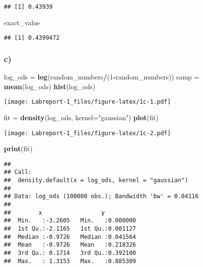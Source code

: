 \documentclass[]{article}
\newenvironment{Shaded}{\begin{snugshade}}{\end{snugshade}}
\newcommand{\DataTypeTok}[1]{\textcolor[rgb]{0.13,0.29,0.53}{#1}}
\newcommand{\DecValTok}[1]{\textcolor[rgb]{0.00,0.00,0.81}{#1}}
\newcommand{\KeywordTok}[1]{\textcolor[rgb]{0.13,0.29,0.53}{\textbf{#1}}}
\newcommand{\NormalTok}[1]{#1}
\newcommand{\OperatorTok}[1]{\textcolor[rgb]{0.81,0.36,0.00}{\textbf{#1}}}
\newcommand{\StringTok}[1]{\textcolor[rgb]{0.31,0.60,0.02}{#1}}
\begin{document}
\begin{verbatim}
## [1] 0.43939
\end{verbatim}

\begin{Shaded}
\begin{Highlighting}[]
\NormalTok{exact_value}
\end{Highlighting}
\end{Shaded}

\begin{verbatim}
## [1] 0.4399472
\end{verbatim}

\hypertarget{c}{%
\subsubsection{c)}\label{c}}

\begin{Shaded}
\begin{Highlighting}[]
\NormalTok{log_ods =}\StringTok{ }\KeywordTok{log}\NormalTok{(random_numbers}\OperatorTok{/}\NormalTok{(}\DecValTok{1}\OperatorTok{-}\NormalTok{random_numbers))}
\NormalTok{samp =}\StringTok{ }\KeywordTok{mean}\NormalTok{(log_ods)}
\KeywordTok{hist}\NormalTok{(log_ods)}
\end{Highlighting}
\end{Shaded}

\texttt{[image: Labreport-1\_files/figure-latex/1c-1.pdf]}

\begin{Shaded}
\begin{Highlighting}[]
\NormalTok{fit =}\StringTok{ }\KeywordTok{density}\NormalTok{(log_ods, }\DataTypeTok{kernel=}\StringTok{"gaussian"}\NormalTok{)}
\KeywordTok{plot}\NormalTok{(fit)}
\end{Highlighting}
\end{Shaded}

\texttt{[image: Labreport-1\_files/figure-latex/1c-2.pdf]}

\begin{Shaded}
\begin{Highlighting}[]
\KeywordTok{print}\NormalTok{(fit)}
\end{Highlighting}
\end{Shaded}

\begin{verbatim}
## 
## Call:
##  density.default(x = log_ods, kernel = "gaussian")
## 
## Data: log_ods (100000 obs.); Bandwidth 'bw' = 0.04116
## 
##        x                 y           
##  Min.   :-3.2605   Min.   :0.000000  
##  1st Qu.:-2.1165   1st Qu.:0.001127  
##  Median :-0.9726   Median :0.041564  
##  Mean   :-0.9726   Mean   :0.218326  
##  3rd Qu.: 0.1714   3rd Qu.:0.392100  
##  Max.   : 1.3153   Max.   :0.885309
\end{verbatim}
\end{document}
